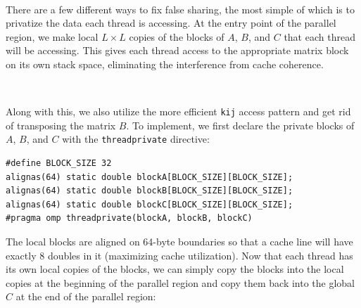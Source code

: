\documentclass{article}
\begin{document}
\

\noindent There are a few different ways to fix false sharing, the most simple of which is to privatize the data 
each thread is accessing. At the entry point of the parallel region, we make local $L \times L$ copies 
of the blocks of $A$, $B$, and $C$ that each thread will be accessing. This gives each thread 
access to the appropriate matrix block on its own stack space, eliminating the interference from cache coherence.

\

\noindent Along with this, we also utilize the more efficient \texttt{kij} access pattern and get rid of transposing the 
matrix $B$. To implement, we first declare the private blocks of $A$, $B$, and $C$ with the \texttt{threadprivate} directive:
\begin{lstlisting}
#define BLOCK_SIZE 32
alignas(64) static double blockA[BLOCK_SIZE][BLOCK_SIZE];
alignas(64) static double blockB[BLOCK_SIZE][BLOCK_SIZE];
alignas(64) static double blockC[BLOCK_SIZE][BLOCK_SIZE]; 
#pragma omp threadprivate(blockA, blockB, blockC)
\end{lstlisting}
The local blocks are aligned on 64-byte boundaries so that a cache line will have exactly 8 doubles in it (maximizing cache utilization).
Now that each thread has its own local copies of the blocks, we can simply copy the blocks into the local
copies at the beginning of the parallel region and copy them back into the global $C$ at the end of the parallel region:
\newpage
\end{document}
